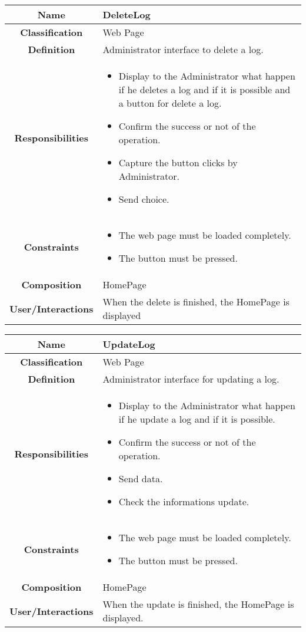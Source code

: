 \documentclass[11pt, a4paper,titlepage]{article}
\begin{document}
\begin{enumerate}
\begin{tabularx}{\textwidth}{| c | X |}
	\hline
	\textbf{Name} & 
	DeleteLog
	\\
	\hline
	\textbf{Classification} & 
	Web Page
	\\
	\hline
	\textbf{Definition} & 
	Administrator interface to delete a log.\\
	\hline
	\textbf{Responsibilities} &
	\begin{itemize}
		\item Display to the Administrator what happen if he deletes a log and if it is possible and a button for delete a log.
		\item Confirm the success or not of the operation.
		\item Capture the button clicks by Administrator.
		\item Send choice.
	\end{itemize}
	\\
	\hline
	\textbf{Constraints} & 
	\begin{itemize}
		\item  The web page must be loaded completely.
		\item The button must be pressed.
	\end{itemize}
	\\
	\hline
	\textbf{Composition} & HomePage
	\\
	\hline
	\textbf{User/Interactions} & 
	When the delete is finished, the HomePage is displayed
	\\
	\hline	
\end{tabularx}

\begin{tabularx}{\textwidth}{| c | X |}
	\hline
	\textbf{Name} & 
	UpdateLog
	\\
	\hline
	\textbf{Classification} & 
	Web Page
	\\
	\hline
	\textbf{Definition} & 
	Administrator interface for updating a log.\\
	\hline
	\textbf{Responsibilities} &
	\begin{itemize}
		\item Display to the Administrator what happen if he update a log and if it is possible.
		\item Confirm the success or not of the operation.
		\item Send data.
		\item Check the informations update.
	\end{itemize}
	\\
	\hline
	\textbf{Constraints} & 
	\begin{itemize}
		\item  The web page must be loaded completely.
		\item The button must be pressed.
	\end{itemize}
	\\
	\hline
	\textbf{Composition} & HomePage
	\\
	\hline
	\textbf{User/Interactions} & 
	When the update is finished, the HomePage is displayed.
	\\
	\hline	
\end{tabularx}


\end{enumerate}
\end{document}
